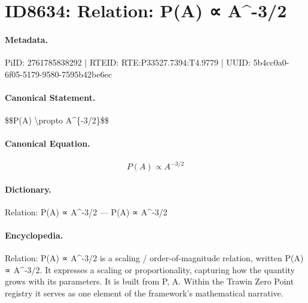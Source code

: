 \section*{ID8634: Relation: P(A) ∝ A\textasciicircum{}-3/2}
\paragraph{Metadata.}
PiID: 2761785838292 | RTEID: RTE:P33527.7394:T4.9779 | UUID: 5b4cc0a0-6f05-5179-9580-7595b42be6ec

\paragraph{Canonical Statement.}
\$\$P(A) \textbackslash{}propto A\textasciicircum{}\{-3/2\}\$\$

\paragraph{Canonical Equation.}
\[
P(A) \propto A^{-3/2}
\]

\paragraph{Dictionary.}
Relation: P(A) ∝ A\textasciicircum{}-3/2 — P(A) ∝ A\textasciicircum{}-3/2

\paragraph{Encyclopedia.}
Relation: P(A) ∝ A\textasciicircum{}-3/2 is a scaling / order-of-magnitude relation, written P(A) ∝ A\textasciicircum{}-3/2. It expresses a scaling or proportionality, capturing how the quantity grows with its parameters. It is built from P, A. Within the Trawin Zero Point registry it serves as one element of the framework's mathematical narrative.
